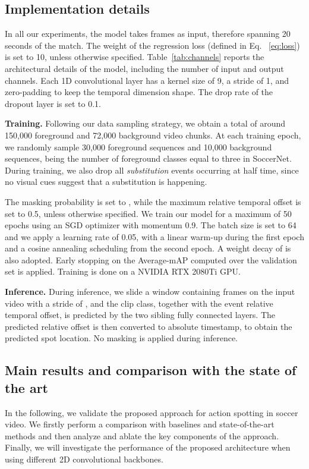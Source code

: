 \documentclass[a4paper,conference]{IEEEtran}
\newcommand{\tit}[1]{\smallbreak\noindent\textbf{#1.}}
\begin{document}
\subsection{Implementation details}
\label{sub:impl_details}
In all our experiments, the model takes  frames as input, therefore spanning 20 seconds of the match. The weight  of the regression loss (defined in Eq. ~\ref{eq:loss}) is set to 10, unless otherwise specified. Table~\ref{tab:channels} reports the architectural details of the model, including the number of input and output channels. Each 1D convolutional layer has a kernel size of 9, a stride of 1, and zero-padding to keep the temporal dimension shape. The drop rate of the dropout layer is set to 0.1.

\tit{Training}
Following our data sampling strategy, we obtain a total of around 150,000 foreground and 72,000 background video chunks.
At each training epoch, we randomly sample 30,000 foreground sequences and 10,000 background sequences, being the number of foreground classes  equal to three in SoccerNet. During training, we also drop all \textit{substitution} events occurring at half time, since no visual cues suggest that a substitution is happening. 

The masking probability  is set to , while the maximum relative temporal offset  is set to 0.5, unless otherwise specified. 
We train our model for a maximum of 50 epochs using an SGD optimizer with momentum 0.9. The batch size is set to 64 and we apply a learning rate of 0.05, with a linear warm-up during the first epoch and a cosine annealing scheduling from the second epoch. A weight decay of  is also adopted. Early stopping on the Average-mAP computed over the validation set is applied. Training is done on a NVIDIA RTX 2080Ti GPU.



\tit{Inference}
During inference, we slide a window containing  frames on the input video with a stride of , and the clip class, together with the event relative temporal offset, is predicted by the two sibling fully connected layers. The predicted relative offset is then converted to absolute timestamp, to obtain the predicted spot location. No masking is applied during inference.

\subsection{Main results and comparison with the state of the art}
In the following, we validate the proposed approach for action spotting in soccer video. We firstly perform a comparison with baselines and state-of-the-art methods and then analyze and ablate the key components of the approach. Finally, we will investigate the performance of the proposed architecture when using different 2D convolutional backbones.
\end{document}

